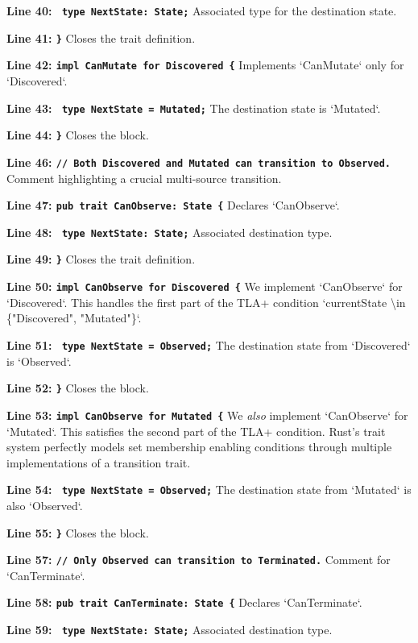 \textbf{Line 40: \texttt{    type NextState: State;}}
Associated type for the destination state.

\textbf{Line 41: \texttt{\}}}
Closes the trait definition.

\textbf{Line 42: \texttt{impl CanMutate for Discovered \{}}
Implements `CanMutate` only for `Discovered`.

\textbf{Line 43: \texttt{    type NextState = Mutated;}}
The destination state is `Mutated`.

\textbf{Line 44: \texttt{\}}}
Closes the block.

\textbf{Line 46: \texttt{// Both Discovered and Mutated can transition to Observed.}}
Comment highlighting a crucial multi-source transition.

\textbf{Line 47: \texttt{pub trait CanObserve: State \{}}
Declares `CanObserve`.

\textbf{Line 48: \texttt{    type NextState: State;}}
Associated destination type.

\textbf{Line 49: \texttt{\}}}
Closes the trait definition.

\textbf{Line 50: \texttt{impl CanObserve for Discovered \{}}
We implement `CanObserve` for `Discovered`. This handles the first part of the TLA+ condition `currentState \textbackslash in \{"Discovered", "Mutated"\}`.

\textbf{Line 51: \texttt{    type NextState = Observed;}}
The destination state from `Discovered` is `Observed`.

\textbf{Line 52: \texttt{\}}}
Closes the block.

\textbf{Line 53: \texttt{impl CanObserve for Mutated \{}}
We \textit{also} implement `CanObserve` for `Mutated`. This satisfies the second part of the TLA+ condition. Rust's trait system perfectly models set membership enabling conditions through multiple implementations of a transition trait.

\textbf{Line 54: \texttt{    type NextState = Observed;}}
The destination state from `Mutated` is also `Observed`.

\textbf{Line 55: \texttt{\}}}
Closes the block.

\textbf{Line 57: \texttt{// Only Observed can transition to Terminated.}}
Comment for `CanTerminate`.

\textbf{Line 58: \texttt{pub trait CanTerminate: State \{}}
Declares `CanTerminate`.

\textbf{Line 59: \texttt{    type NextState: State;}}
Associated destination type.

